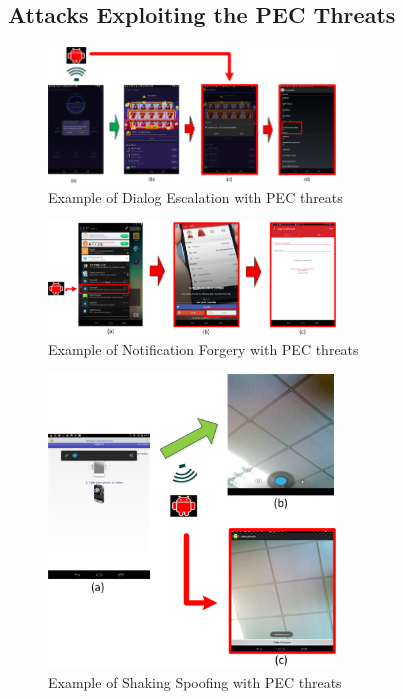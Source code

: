 
\subsection{Attacks Exploiting the PEC Threats}

\begin{figure}
\centering
\includegraphics[width = 3.0in]{pic2.png}
\caption{\label{}Example of Dialog Escalation with PEC threats}
\end{figure}

\begin{figure}
\centering
\includegraphics[width = 3.0in]{pic3.png}
\caption{\label{}Example of Notification Forgery with PEC threats}
\end{figure}

\begin{figure}
\centering
\includegraphics[width = 3.0in]{pic4.png}
\caption{\label{}Example of Shaking Spoofing with PEC threats}
\end{figure}

